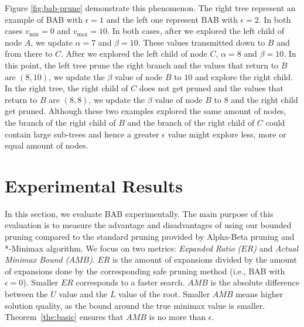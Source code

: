 \documentclass[letterpaper]{article} %
\newcounter{bab}
\newcommand{\pess}{\mathit{L}}
\newcommand{\opti}{\mathit{U}}
\newcommand{\vmax}{v_{\text{max}}}
\newcommand{\vmin}{v_{\text{min}}}
\newcommand{\amb}{\textit{AMB}}
\newcommand{\er}{\textit{ER}}
\begin{document}
Figure \ref{fig:bab-prune} demonstrate this phenomenon. The right tree represent an example of BAB with $\epsilon = 1$ and the left one represent BAB with $\epsilon = 2$. In both cases $\vmin = 0$ and $\vmax = 10$. In both cases, after we explored the left child of node $A$, we update $\alpha = 7$ and $\beta = 10$. These values transmitted down to $B$ and from there to $C$. After we explored the left child of node $C$, $\alpha = 8$ and $\beta = 10$. In this point, the left tree prune the right branch and the values that return to $B$ are $(8,10)$, we update the $\beta$ value of node $B$ to $10$ and explore the right child. In the right tree, the right child of $C$ does not get pruned and the values that return to $B$ are $(8,8)$, we update the $\beta$ value of node $B$ to $8$ and the right child get pruned.
Although these two examples explored the same amount of nodes, the branch of the right child of $B$ and the branch of the right child of $C$ could contain large sub-trees and hence a greater $\epsilon$ value might explore less, more or equal amount of nodes. 







\section{Experimental Results}

In this section, we evaluate BAB experimentally. 
The main purpose of this evaluation is to measure the advantage and disadvantages of using our bounded pruning compared to the standard pruning provided by Alpha-Beta pruning and *-Minimax algorithm. We focus on two metrics: \emph{Expanded Ratio ($\er$)} and \emph{Actual Minimax Bound ($\amb$)}.
$\er$ is the amount of expansions divided by the amount of expansions done by the corresponding safe pruning method (i.e., BAB with $\epsilon=0$). Smaller $\er$ corresponds to a faster search. 
$\amb$ is the absolute difference between the $\opti$ value and the $\pess$ value of the root. Smaller $\amb$ means higher solution quality, as the bound around the true minimax value is smaller.
Theorem~\ref{the:basic} ensures that $\amb$ is no more than $\epsilon$.
\end{document}
